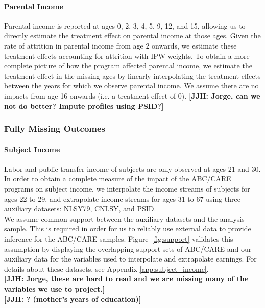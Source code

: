 \paragraph{Parental Income}

\noindent Parental income is reported at ages 0, 2, 3, 4, 5, 9, 12, and 15, allowing us to directly estimate
the treatment effect on parental income at those ages. Given the rate of attrition in
parental income from age 2 onwards, we estimate these treatment effects accounting for attrition
with IPW weights.
To obtain a more complete picture of how the
program affected parental income, we estimate the treatment effect in the missing ages by linearly
interpolating the treatment effects between the years for which we observe parental income. We assume
there are no impacts from age 16 onwards (i.e. a treatment effect of 0). \textbf{[JJH: Jorge, can we not do better? Impute profiles using PSID?]}\\


\subsubsection{Fully Missing Outcomes}
\label{app:method_noobs}

\paragraph{Subject Income}

\noindent Labor and public-transfer income of subjects are only observed at ages 21 and 30. In order
to obtain a complete measure of the impact of the ABC/CARE programs on subject income, we interpolate
the income streams of subjects for ages 22 to 29, and extrapolate income streams for ages
31 to 67 using three auxiliary datasets: NLSY79, CNLSY, and PSID. \\

\noindent We assume common support between the auxiliary
datasets and the analysis sample. This is required in order for us to reliably use external data to provide inference for the ABC/CARE samples. Figure~\ref{fig:support} validates this
assumption by displaying the overlapping support sets of ABC/CARE and our auxiliary data for
the variables used to interpolate and extrapolate earnings. For details about these datasets, see Appendix \ref{app:subject_income}. \\

\noindent \textbf{[JJH: Jorge, these are hard to read and we are missing many of the variables we use to project.]} \\
\textbf{[JJH: ? (mother's years of education)]}


